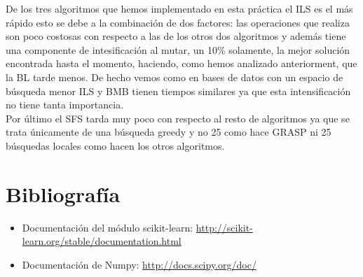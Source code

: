 \documentclass[10pt,a4paper]{article}
\begin{document}
De los tres algoritmos que hemos implementado en esta práctica el ILS es el más rápido esto se debe a la combinación de dos factores: las operaciones que realiza son poco costosas con respecto a las de los otros dos algoritmos y además tiene una componente de intesificación al mutar, un 10\% solamente, la mejor solución encontrada hasta el momento, haciendo, como hemos analizado anteriorment, que la BL tarde menos. De hecho vemos como en bases de datos con un espacio de búsqueda menor ILS y BMB tienen tiempos similares ya que esta intensificación no tiene tanta importancia.\\

Por último el SFS tarda muy poco con respecto al resto de algoritmos ya que se trata únicamente de una búsqueda greedy y no 25 como hace GRASP ni 25 búsquedas locales como hacen los otros algoritmos.\\

\newpage
\section{\color[rgb]{0.0,0.0,0.21}Bibliografía}

\begin{itemize}
\item Documentación del módulo scikit-learn: \url{http://scikit-learn.org/stable/documentation.html}
\item Documentación de Numpy: \url{http://docs.scipy.org/doc/}
\end{itemize}
\end{document}

